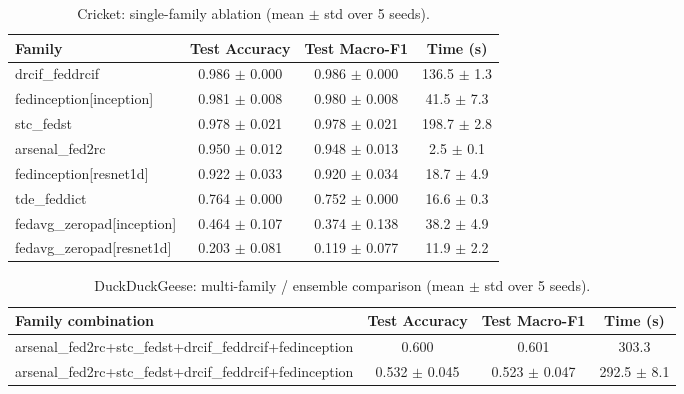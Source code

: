 \begin{table}[t]
\centering
\caption{Cricket: single-family ablation (mean $\pm$ std over 5 seeds).}
\label{tab:results_cricket_ablation}
\begin{tabular}{lccc}
\toprule
Family & Test Accuracy & Test Macro-F1 & Time (s) \\
\midrule
drcif\_feddrcif & 0.986 $\pm$ 0.000 & 0.986 $\pm$ 0.000 & 136.5 $\pm$ 1.3 \\
fedinception[inception] & 0.981 $\pm$ 0.008 & 0.980 $\pm$ 0.008 & 41.5 $\pm$ 7.3 \\
stc\_fedst & 0.978 $\pm$ 0.021 & 0.978 $\pm$ 0.021 & 198.7 $\pm$ 2.8 \\
arsenal\_fed2rc & 0.950 $\pm$ 0.012 & 0.948 $\pm$ 0.013 & 2.5 $\pm$ 0.1 \\
fedinception[resnet1d] & 0.922 $\pm$ 0.033 & 0.920 $\pm$ 0.034 & 18.7 $\pm$ 4.9 \\
tde\_feddict & 0.764 $\pm$ 0.000 & 0.752 $\pm$ 0.000 & 16.6 $\pm$ 0.3 \\
fedavg\_zeropad[inception] & 0.464 $\pm$ 0.107 & 0.374 $\pm$ 0.138 & 38.2 $\pm$ 4.9 \\
fedavg\_zeropad[resnet1d] & 0.203 $\pm$ 0.081 & 0.119 $\pm$ 0.077 & 11.9 $\pm$ 2.2 \\
\bottomrule
\end{tabular}
\end{table}

\begin{table}[t]
\centering
\caption{DuckDuckGeese: multi-family / ensemble comparison (mean $\pm$ std over 5 seeds).}
\label{tab:results_duckduckgeese_ensemble}
\begin{tabular}{lccc}
\toprule
Family combination & Test Accuracy & Test Macro-F1 & Time (s) \\
\midrule
arsenal\_fed2rc+stc\_fedst+drcif\_feddrcif+fedinception & 0.600 & 0.601 & 303.3 \\
arsenal\_fed2rc+stc\_fedst+drcif\_feddrcif+fedinception & 0.532 $\pm$ 0.045 & 0.523 $\pm$ 0.047 & 292.5 $\pm$ 8.1 \\
\bottomrule
\end{tabular}
\end{table}

